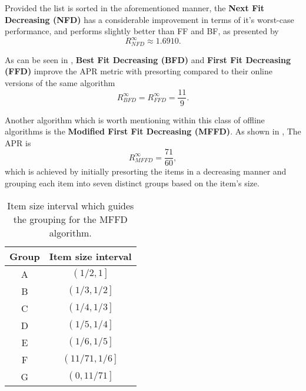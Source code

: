 Provided the list is sorted in the aforementioned manner, the \textbf{Next Fit
Decreasing (NFD)} has a considerable improvement in terms of it's worst-case
performance, and performs slightly better than FF and BF, as presented by
\cite{baker1981tight}
\begin{equation}
    R_{NFD}^\infty \approx 1.6910.
\end{equation}

As can be seen in \cite{johnson1974worst}, \textbf{Best Fit Decreasing (BFD)}
and \textbf{First Fit Decreasing (FFD)} improve the APR metric with presorting
compared to their online versions of the same algorithm 
\begin{equation}
    R_{BFD}^\infty = R_{FFD}^\infty = \frac{11}{9}.
\end{equation}

Another algorithm which is worth mentioning within this class of offline
algorithms is the \textbf{Modified First Fit Decreasing (MFFD)}. As shown in
\cite{johnson19857160}, The APR is
\begin{equation}
    R_{MFFD}^\infty = \frac{71}{60},
\end{equation}
which is achieved by initially presorting the items in a decreasing manner and
grouping each item into seven distinct groups based on the item's size. 

\begin{table}[H]
\caption{Item size interval which guides the grouping for the MFFD algorithm.}
\begin{center}
\begin{tabular}{ |c|c| } 
    \hline
    Group & Item size interval \\ 
    \hline
    A & $\left( 1/2, 1 \right]$ \\ 
    B & $\left( 1/3, 1/2 \right]$ \\ 
    C & $\left( 1/4, 1/3 \right]$ \\ 
    D & $\left( 1/5, 1/4 \right]$ \\ 
    E & $\left( 1/6, 1/5 \right]$ \\ 
    F & $\left( 11/71, 1/6 \right]$ \\ 
    G & $\left( 0, 11/71 \right]$ \\ 
\hline
\end{tabular}
\end{center}
\end{table}

